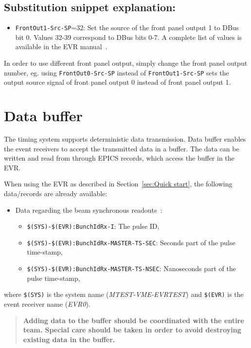 \documentclass[12pt,a4paper]{article}
\begin{document}
\subsection{Substitution snippet explanation:}\label{sec:explain_dbus}
\begin{itemize}
	\item \texttt{FrontOut1-Src-SP}=32: Set the source of the front panel output 1  to DBus bit 0. Values 32-39 correspond to DBus bits 0-7. A complete list of values is available in the EVR manual~\cite{evr_manual}.
\end{itemize}

In order to use different front panel output, simply change the front panel output number, eg. using \texttt{FrontOut0-Src-SP} instead of \texttt{FrontOut1-Src-SP} sets the output source signal of front panel output 0 instead of front panel output 1.

\section{Data buffer}\label{sec:data_buffer}
The timing system supports deterministic data transmission. Data buffer enables the event receivers to accept the transmitted data in a buffer. The data can be written and read from through EPICS records, which access the buffer in the EVR.

When using the EVR as described in Section~\ref{sec:Quick start}, the following data/records are already available:
\begin{itemize}
\item Data regarding the beam synchronous readouts~\cite{bsread}:
	\begin{itemize}
	\item \texttt{\$(SYS)-\$(EVR):BunchIdRx-I}: The pulse ID,
	\item \texttt{\$(SYS)-\$(EVR):BunchIdRx-MASTER-TS-SEC}: Seconds part of the pulse time-stamp,
	\item \texttt{\$(SYS)-\$(EVR):BunchIdRx-MASTER-TS-NSEC}: Nanoseconds part of the pulse time-stamp,
	\end{itemize}
\end{itemize}
where \texttt{\$(SYS)} is the system name (\textit{MTEST-VME-EVRTEST}) and \texttt{\$(EVR)} is the event receiver name (\textit{EVR0}).

\begin{quote}
\textbf{Adding data to the buffer should be coordinated with the entire team. Special care should be taken in order to avoid destroying existing data in the buffer.}
\end{quote}
\end{document}
